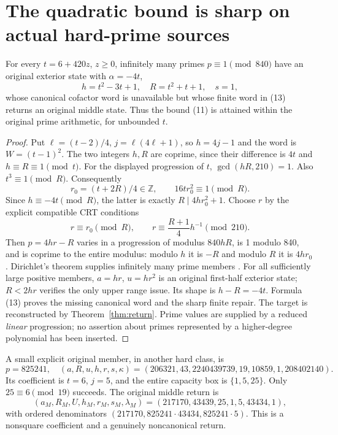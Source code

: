 \section{The quadratic bound is sharp on actual hard-prime sources}
\begin{theorem}\label{thm:sharp}
For every $t=6+420z$, $z\ge0$, infinitely many primes $p\equiv1\pmod{840}$ have
an original exterior state with $\alpha=-4t$,
\[
 h=t^2-3t+1,\quad R=t^2+t+1,\quad s=1,
\]
whose canonical cofactor word is unavailable but whose finite word in (13)
returns an original middle state. Thus the bound (11) is attained within the
original prime arithmetic, for unbounded $t$.
\end{theorem}
\begin{proof}
Put $\ell=(t-2)/4$, $j=\ell(4\ell+1)$, so $h=4j-1$ and the word is
$W=(t-1)^2$. The two integers $h,R$ are coprime, since their difference is $4t$
and $h\equiv R\equiv1\pmod t$. For the displayed progression of $t$,
$\gcd(hR,210)=1$. Also $t^3\equiv1\pmod R$. Consequently
\[
 r_0=(t+2R)/4\in\mathbb Z,
 \qquad16tr_0^2\equiv1\pmod R.
\]
Since $h\equiv-4t\pmod R$, the latter is exactly
$R\mid4hr_0^2+1$.
Choose $r$ by the explicit compatible CRT conditions
\[
 r\equiv r_0\pmod R,\qquad
 r\equiv\frac{R+1}{4}h^{-1}\pmod{210}.
\]
Then $p=4hr-R$ varies in a progression of modulus $840hR$, is 1 modulo 840,
and is coprime to the entire modulus: modulo $h$ it is $-R$ and modulo $R$
it is $4hr_0$. Dirichlet's theorem supplies infinitely many prime members
\cite[Theorem 18.1]{Dirichlet}. For all sufficiently large positive members,
$a=hr$, $u=hr^2$ is an original first-half exterior state; $R<2hr$ verifies the
only upper range issue. Its shape is $h-R=-4t$. Formula (13) proves the missing
canonical word and the sharp finite repair. The target is reconstructed by
Theorem~\ref{thm:return}. Prime values are supplied by a reduced \emph{linear}
progression; no assertion about primes represented by a higher-degree polynomial
has been inserted.
\end{proof}

A small explicit original member, in another hard class, is
\[
 \boxed{p=825241,\quad
 (a,R,u,h,r,s,\kappa)=(206321,43,2240439739,19,10859,1,208402140).}    \tag{17}
\]
Its coefficient is $t=6$, $j=5$, and the entire capacity box is $\{1,5,25\}$.
Only $25\equiv6\pmod{19}$ succeeds. The original middle return is
\[
 (a_M,R_M,U,h_M,r_M,s_M,\lambda_M)
 =(217170,43439,25,1,5,43434,1),                           \tag{18}
\]
with ordered denominators $(217170,825241\cdot43434,825241\cdot5)$.
This is a nonsquare coefficient and a genuinely noncanonical return.

